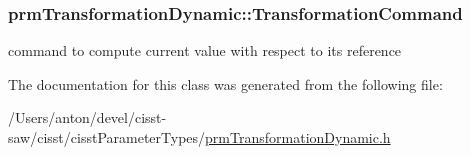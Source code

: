 \subsubsection[{Transformation\+Command}]{ prm\+Transformation\+Dynamic\+::\+Transformation\+Command\hspace{0.3cm}{\ttfamily [protected]}}\label{classprm_transformation_dynamic_a09131f273e7dd6388d357b6830ff5069}
command to compute current value with respect to its reference 

The documentation for this class was generated from the following file\+:\begin{DoxyCompactItemize}
\item 
/\+Users/anton/devel/cisst-\/saw/cisst/cisst\+Parameter\+Types/\hyperlink{prm_transformation_dynamic_8h}{prm\+Transformation\+Dynamic.\+h}\end{DoxyCompactItemize}
